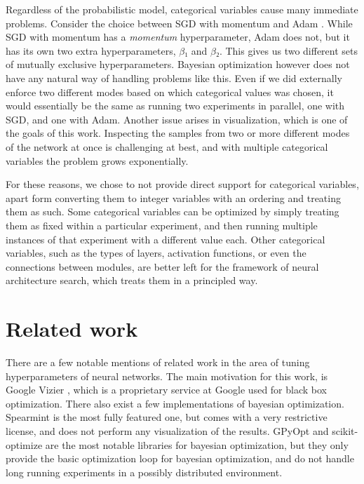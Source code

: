 Regardless of the probabilistic model, categorical variables cause many
immediate problems.  Consider the choice between SGD with momentum
\citep{overview-of-sgd} and Adam \citep{kingma2014adam}.  While SGD with
momentum has a \emph{momentum} hyperparameter, Adam does not, but it has its
own two extra hyperparameters, $β₁$ and $β₂$. This gives us two different sets
of mutually exclusive hyperparameters. Bayesian optimization however does not
have any natural way of handling problems like this. Even if we did externally
enforce two different modes based on which categorical values was chosen, it
would essentially be the same as running two experiments in parallel, one with
SGD, and one with Adam. Another issue arises in visualization, which is one of
the goals of this work. Inspecting the samples from two or more different modes
of the network at once is challenging at best, and with multiple categorical
variables the problem grows exponentially.

For these reasons, we chose to not provide direct support for categorical
variables, apart form converting them to integer variables with an ordering and
treating them as such. Some categorical variables can be optimized by simply
treating them as fixed within a particular experiment, and then running
multiple instances of that experiment with a different value each. Other
categorical variables, such as the types of layers, activation functions, or
even the connections between modules, are better left for the framework of
neural architecture search, which treats them in a principled way.


\section{Related work}

There are a few notable mentions of related work in the area of tuning
hyperparameters of neural networks. The main motivation for this work, is
Google Vizier \citep{google-vizier}, which is a proprietary service at Google
used for black box optimization. There also exist a few implementations of
bayesian optimization. Spearmint \citep{spearmint} is the most fully featured
one, but comes with a very restrictive license, and does not perform any
visualization of the results. GPyOpt \citep{gpyopt2016} and scikit-optimize
\citep{scikit-optimize} are the most notable libraries for bayesian
optimization, but they only provide the basic optimization loop for bayesian
optimization, and do not handle long running experiments in a possibly
distributed environment.



